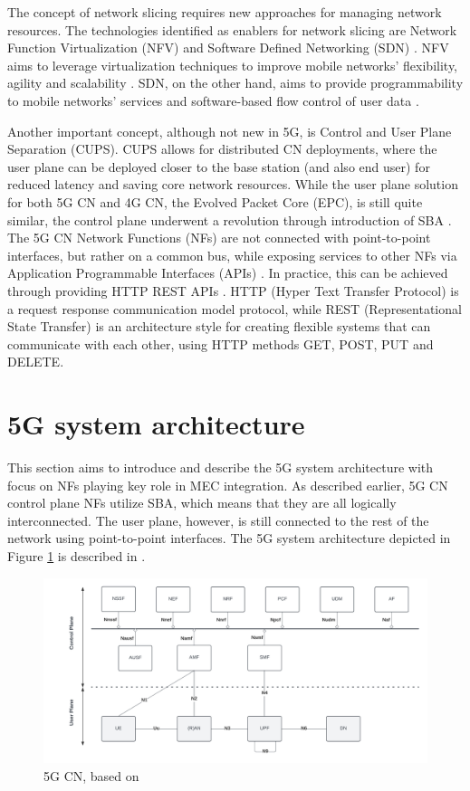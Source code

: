 \documentclass[12pt,a4paper,twoside]{report}
\begin{document}
The concept of network slicing requires new approaches for managing network resources. The technologies identified as enablers for network slicing are Network Function Virtualization (NFV) and Software Defined Networking (SDN) \cite{yousaf2017nfv}. NFV aims to leverage virtualization techniques to improve mobile networks’ flexibility, agility and scalability \cite{yousaf2017nfv}. SDN, on the other hand, aims to provide programmability to mobile networks’ services and software-based flow control of user data \cite{yousaf2017nfv}.
  
Another important concept, although not new in 5G, is Control and User Plane Separation (CUPS). CUPS allows for distributed CN deployments, where the user plane can be deployed closer to the base station (and also end user) for reduced latency and saving core network resources. While the user plane solution for both 5G CN and 4G CN, the Evolved Packet Core (EPC), is still quite similar, the control plane underwent a revolution through introduction of SBA \cite{rommer20195g}. The 5G CN Network Functions (NFs) are not connected with point-to-point interfaces, but rather on a common bus, while exposing services to other NFs via Application Programmable Interfaces (APIs) \cite{rommer20195g}. In practice, this can be achieved through providing HTTP REST APIs \cite{sabella-mec-sw-dev,rommer20195g}. HTTP (Hyper Text Transfer Protocol) is a request response communication model protocol, while REST (Representational State Transfer) is an architecture style for creating flexible systems that can communicate with each other, using HTTP methods GET, POST, PUT and DELETE.

\section{5G system architecture}
This section aims to introduce and describe the 5G system architecture with focus on NFs playing key role in MEC integration. As described earlier, 5G CN control plane NFs utilize SBA, which means that they are all logically interconnected. The user plane, however, is still connected to the rest of the network using point-to-point interfaces. The 5G system architecture depicted in Figure \ref{F:5G-arch} is described in \cite{ETSI:TS:5G}.

\begin{figure}[ht]
	\centering
	\includegraphics[width=\textwidth]{./images/5G-CN.png}
	\caption{5G CN, based on \cite{ETSI:TS:5G}}
	\label{F:5G-arch}
\end{figure}
\end{document}
